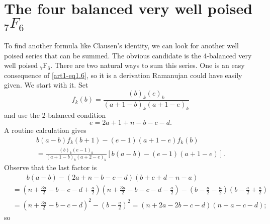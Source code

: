 \section{The four balanced very well poised ${}_7F_6$}\label{art1-sec2}
To find another formula like Clausen's identity, we can look for another well poised series that can be summed. The obvious candidate is the 4-balanced very well poised ${}_7$F$_6$. There are two natural ways to sum this series. One is an easy consequence of \eqref{art1-eq1.6}, so it is a derivation Ramanujan could have easily given. We start with it. Set 
\setcounter{equation}{0}
\begin{equation}
f_k (b) = \frac{(b)_k(e)_k}{(a+1-b)_k(a+1-e)_k}\label{art1-eq2.1}
\end{equation}
and use the 2-balanced condition
\begin{equation}
e= 2 a + 1 + n -b - c - d. 
\label{art1-eq2.2}
\end{equation}
A routine calculation gives 
\begin{gather*}
b (a-b) f_k (b+1) - (e-1) (a+1-e)f_k (b)\\
= \frac{(b)_k(e-1)_k}{(a+1-b)_k (a+2 -e)_k} [b(a-b) -(e-1) (a+1-e)].
\end{gather*}
Observe that the last factor is 
{\fontsize{9}{11}\selectfont
\begin{align*}
& \qquad b (a-b) - (2 a+ n - b - c -d) (b+c + d- n -a)\\
& = (n+ \frac{3a}{2} - b - c - d + \frac{a}{2}) (n + \frac{3a}{2} - b - c -d -\frac{a}{2}) - (b - \frac{a}{2}- \frac{a}{2}) (b- \frac{a}{2} + \frac{a}{2})\\
& = (n+ \frac{3a}{2} - b - c - d)^2 - (b- \frac{a}{2})^2 = (n+2 a -  2 b - c -d) (n+a - c -d);
\end{align*}}
so 
